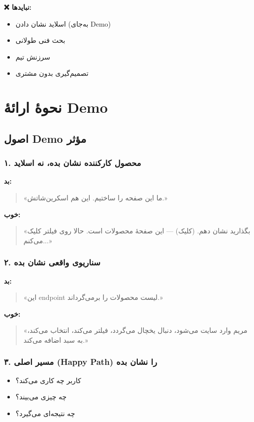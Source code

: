 \documentclass[12pt, a4paper]{article}
\begin{document}
\textbf{❌ نبایدها:}
\begin{itemize}
    \item اسلاید نشان دادن (به‌جای Demo)
    \item بحث فنی طولانی
    \item سرزنش تیم
    \item تصمیم‌گیری بدون مشتری
\end{itemize}

\section{نحوهٔ ارائهٔ Demo}

\subsection{اصول Demo مؤثر}

\subsubsection{۱. محصول کارکننده نشان بده، نه اسلاید}

\textbf{بد:}
\begin{quote}
«ما این صفحه را ساختیم. این هم اسکرین‌شاتش.»
\end{quote}

\textbf{خوب:}
\begin{quote}
«بگذارید نشان دهم. (کلیک) — این صفحهٔ محصولات است. حالا روی فیلتر کلیک 
می‌کنم...»
\end{quote}

\subsubsection{۲. سناریوی واقعی نشان بده}

\textbf{بد:}
\begin{quote}
«این endpoint لیست محصولات را برمی‌گرداند.»
\end{quote}

\textbf{خوب:}
\begin{quote}
«مریم وارد سایت می‌شود، دنبال یخچال می‌گردد، فیلتر می‌کند، انتخاب می‌کند، به 
سبد اضافه می‌کند.»
\end{quote}

\subsubsection{۳. مسیر اصلی (Happy Path) را نشان بده}
\begin{itemize}
    \item کاربر چه کاری می‌کند؟
    \item چه چیزی می‌بیند؟
    \item چه نتیجه‌ای می‌گیرد؟
\end{itemize}
\end{document}
